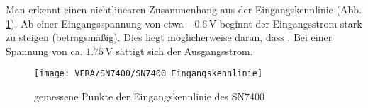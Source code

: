 Man erkennt einen nichtlinearen Zusammenhang aus der Eingangskennlinie (Abb. \ref{fig:7400_eingang}). Ab einer Eingangsspannung von etwa $-0.6 \, \si{\volt}$ beginnt der Eingangsstrom stark zu steigen (betragsmäßig). Dies liegt möglicherweise daran, dass . Bei einer Spannung von ca. $1.75 \, \si{\volt}$ sättigt sich der Ausgangsstrom.

\begin{figure}[h]
  \begin{center}
    \texttt{[image: VERA/SN7400/SN7400\_Eingangskennlinie]}
  \end{center}
  \caption{gemessene Punkte der Eingangskennlinie des SN7400}
  \label{fig:7400_eingang}
\end{figure}